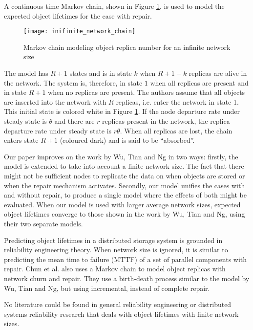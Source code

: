 A continuous time Markov chain, shown in Figure \ref{fig_other_markov_chain}, is used to model the expected object lifetimes for the case with repair.
%
\begin{figure}[htbp]
 \centering
 \texttt{[image: inifinite\_network\_chain]}
 \caption{Markov chain modeling object replica number for an infinite network size}
 \label{fig_other_markov_chain}
\end{figure}
%
The model has $R+1$ states and is in state $k$ when $R+1-k$ replicas are alive in the network. The system is, therefore, in state $1$ when all replicas are present and in state $R+1$ when no replicas are present. The authors assume that all objects are inserted into the network with $R$ replicas, i.e. enter the network in state 1. This initial state is colored white in Figure \ref{fig_other_markov_chain}. If the node departure rate under steady state is $\theta$ and there are $r$ replicas present in the network, the replica departure rate under steady state is $r\theta$. When all replicas are lost, the chain enters state $R+1$ (coloured dark) and is said to be ``absorbed''.

Our paper improves on the work by Wu, Tian and Ng \cite{replication_article} in two ways: firstly, the model is extended to take into account a finite network size. The fact that there might not be sufficient nodes to replicate the data on when objects are stored or when the repair mechanism activates. Secondly, our model unifies the cases with and without repair, to produce a single model where the effects of both might be evaluated. When our model is used with larger average network sizes, expected object lifetimes converge to those shown in the work by Wu, Tian and Ng, using their two separate models.

Predicting object lifetimes in a distributed storage system is grounded in reliability engineering theory. When network size is ignored, it is similar to predicting the mean time to failure (MTTF) of a set of parallel components with repair. Chun et al. \cite{Chun:2006_replica_maintenance} also uses a Markov chain to model object replicas with network churn and repair. They use a birth-death process similar to the model by Wu, Tian and Ng, but using incremental, instead of complete repair.

No literature could be found in general reliability engineering or distributed systems reliability research that deals with object lifetimes with finite network sizes.

